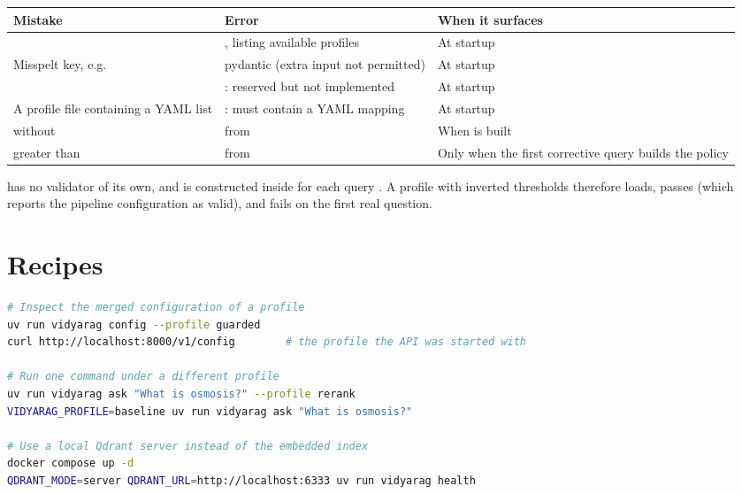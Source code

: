 \begin{center}
\begin{tabularx}{\textwidth}{@{}>{\raggedright\arraybackslash}p{5.0cm}>{\raggedright\arraybackslash}p{5.3cm}L@{}}
\toprule
\textbf{Mistake} & \textbf{Error} & \textbf{When it surfaces}\\
\midrule
{} & , listing available profiles & At startup\\
Misspelt key, e.g.\  & pydantic  (extra input not permitted) & At startup\\
 & : reserved but not implemented & At startup\\
A profile file containing a YAML list & : must contain a YAML mapping & At startup\\
 without  &  from  & When  is built\\
 greater than  &  from  & Only when the first corrective query builds the policy \\
\bottomrule
\end{tabularx}
\end{center}

\begin{inferred}
 has no validator of its own, and  is constructed inside  for each query . A profile with inverted thresholds therefore loads, passes  (which reports the pipeline configuration as valid), and fails on the first real question.
\end{inferred}

\section{Recipes}

\begin{lstlisting}[language=bash]
# Inspect the merged configuration of a profile
uv run vidyarag config --profile guarded
curl http://localhost:8000/v1/config        # the profile the API was started with

# Run one command under a different profile
uv run vidyarag ask "What is osmosis?" --profile rerank
VIDYARAG_PROFILE=baseline uv run vidyarag ask "What is osmosis?"

# Use a local Qdrant server instead of the embedded index
docker compose up -d
QDRANT_MODE=server QDRANT_URL=http://localhost:6333 uv run vidyarag health
\end{lstlisting}

